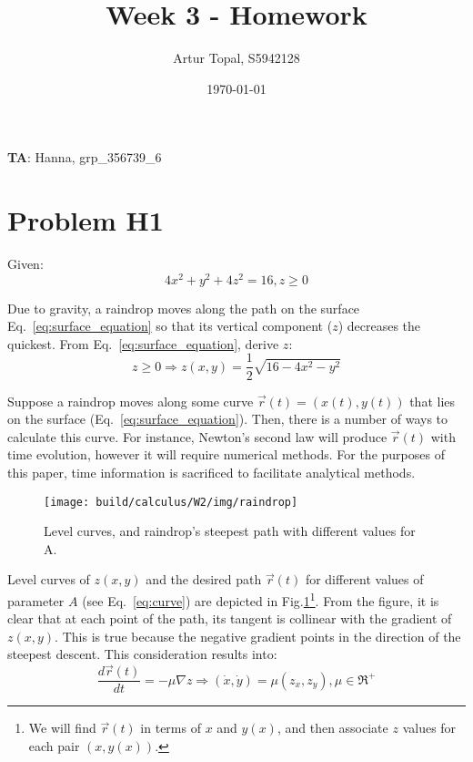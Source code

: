 \documentclass{article}
\title{Week 3 - Homework}
\author{Artur Topal, S5942128}
\date{\today}
\begin{document}
\maketitle

\begin{center}
  \textbf{TA}: Hanna, grp\_356739\_6
\end{center}

\pagebreak

\section{ Problem H1 } 
Given:
\begin{equation} \label{eq:surface_equation}
4x^2 + y^2 + 4z^2 = 16, z \ge 0
\end{equation}

Due to gravity, a raindrop moves along the path on the surface Eq.~\eqref{eq:surface_equation} so that its vertical component ($z$) decreases the quickest. From Eq.~\eqref{eq:surface_equation}, derive $z$:
\begin{equation*}
  z \ge 0 \Rightarrow z(x, y) = \frac{1}{2}\sqrt{16 - 4x^2 - y^2}
\end{equation*}

Suppose a raindrop moves along some curve $\vec{r}(t) = (x(t), y(t))$ that lies on the surface (Eq.~\eqref{eq:surface_equation}). Then, there is a number of ways to calculate this curve. For instance, Newton's second law will produce $\vec{r}(t)$ with time evolution, however it will require numerical methods. For the purposes of this paper, time information is sacrificed to facilitate analytical methods.

\begin{figure}[H]
  \centering
  \texttt{[image: build/calculus/W2/img/raindrop]}
  \caption{Level curves, and raindrop's steepest path with different values for A.}
  \label{fig:raindrop_path}
\end{figure}

Level curves of $z(x, y)$ and the desired path $\vec{r}(t)$ for different values of parameter $A$ (see Eq.~\eqref{eq:curve}) are depicted in Fig.\ref{fig:raindrop_path}\footnote{We will find $\vec{r}(t)$ in terms of $x$ and $y(x)$, and then associate $z$ values for each pair $(x, y(x))$.}. From the figure, it is clear that at each point of the path, its tangent is collinear with the gradient of $z(x, y)$. This is true because the negative gradient points in the direction of the steepest descent. This consideration results into:
\begin{equation*}
  \frac{d\vec{r}(t)}{dt} = - \mu \nabla{z} \Rightarrow (\dot{x}, \dot{y}) = \mu (z_x, z_y), \mu \in \Re^{+}
\end{equation*}
\end{document}
